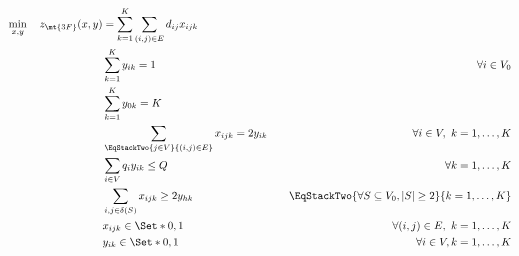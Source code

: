 \begin{align}
	\min_{x, y} \quad z_\mt{3F}(x, y) & =  \sum_{k = 1}^K \sum_{(i, j) \in E} d_{ij} x_{ijk} \label{eq:three-index-flow-obj-func}                                                                                                                          \\
	                                  & \sum_{k = 1}^K y_{ik} = 1                                                                 & \quad \forall i \in V_0                                              \label{eq:three-index-flow-all-customers-visited} \\
	                                  & \sum_{k = 1}^K y_{0k} = K                                                                 & \label{eq:three-index-flow-tour-starts-and-ends-at-depot}                                                              \\
	                                  & \sum_{\EqStackTwo{j \in V}{(i, j) \in E}} x_{ijk} = 2 y_{ik}                              & \quad \forall i \in V,\ k = 1, \dots, K \label{eq:three-index-flow-force-visited-customer-if-flow}                     \\
	                                  & \sum_{i \in V} q_i y_{ik} \le Q                                                           & \quad \forall k = 1, \dots, K \label{eq:three-index-flow-force-resource-upper-bound}                                   \\
	                                  & \sum_{i, j \in \delta(S)} x_{ijk} \ge 2 y_{hk}                                            & \quad \EqStackTwo{\forall S \subseteq V_0, |S| \ge 2}{k = 1, \dots, K} \label{eq:three-index-flow-secv1}               \\
	                                  & x_{ijk}                   \in \Set*{0, 1}                                                 & \quad \forall (i, j) \in E,\ k = 1, \dots, K             \label{eq:three-index-flow-x-mip-var-bounds}                  \\
	                                  & y_{ik}                    \in \Set*{0, 1}                                                 & \quad \forall i \in V,k = 1, \dots, K  \label{eq:three-index-flow-y-mip-var-bounds}
\end{align}

